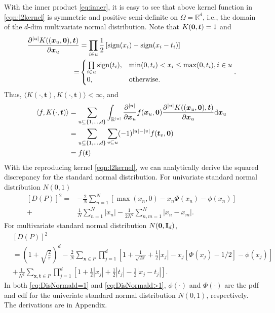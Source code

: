 \documentclass[graybox]{svmult}
\newcommand{\vx}{\boldsymbol{x}}
\newcommand{\vt}{\boldsymbol{t}}
\newcommand{\dif}{{\rm d}}
\DeclareMathOperator{\sign}{sign}
\begin{document}
With the inner product \eqref{eq:inner}, it is easy to see that above kernel function in \eqref{eqn:l2kernel} is symmetric and positive semi-definite on $\Omega = \mathbb{R}^d$, i.e., the domain of the $d$-dim multivariate normal distribution. 
Note that $K({\bf 0},\vt) = 1$ and
\begin{align*}
\frac{\partial^{|u|} K((\vx_u,{\bf 0}),\vt)}{\partial \vx_u}& =\prod_{i\in u}\frac 12 \left[\sign(x_i) - \sign(x_i - t_i) \right] \\
= &\begin{cases}
\prod\limits_{i\in u}\sign(t_i), & \min(0,t_i) < x_i \leq \max(0,t_i), i\in u\\
0, & \textrm{otherwise}.
\end{cases}.
\end{align*}
Thus, $\langle K(\cdot,\vt), K(\cdot,\vt) \rangle < \infty $, and
\begin{align*}
\langle f, K(\cdot,\vt) \rangle &= \sum_{u\subseteq \{1,...,d\}}\int_{\mathbb{R}^{|u|}}\frac{\partial^{|u|}}{\partial \vx_u}f(\vx_u,{\bf 0})\frac{\partial^{|u|} K((\vx_u,{\bf 0}),\vt)}{\partial \vx_u}\dif \vx_u \\
& =     \sum_{u\subseteq \{1,...,d\}}\sum_{v\subseteq u}(-1)^{|u|-|v|}f(\vt_v,{\bf 0})\\
& = f(\vt)
\end{align*}
With the reproducing kernel \eqref{eqn:l2kernel}, we can analytically derive the  squared discrepancy for the standard normal distribution. 
For univariate standard normal distribution $N(0,1)$ 
\begin{align}\label{eq:DisNormald=1}\nonumber
[D(P)]^2=& -\frac{2}{N}\sum_{n=1}^N \left[\max(x_n,0)-x_n\Phi(x_n)-\phi(x_n)\right]\\
+&\frac{1}{N}\sum_{n=1}^N|x_n|-\frac{1}{2N^2}\sum_{n,m=1}^N|x_n-x_m|. 
\end{align}
For multivariate standard normal distribution $N({\bf 0}, {\bf I}_d)$, 
\begin{align}\label{eq:DisNormald>1}\nonumber
&[D(P)]^2\\\nonumber
  &= \left(1+\sqrt{\frac{2}{\pi}}\right)^d - \frac{2}{N}\sum\limits_{\vx\in P} \prod\limits_{j=1}^d\left[ 1+\frac{1}{\sqrt{2\pi}}+\frac{1}{2}|x_j|-x_j[\Phi(x_j)-1/2]-\phi(x_j)\right]\\
  &+\frac{1}{N^2}\sum_{\vx,\vt\in P}\prod_{j=1}^d \left[1+\frac{1}{2}|x_j|+\frac{1}{2}|t_j|-\frac{1}{2}|x_j-t_j|\right]. 
\end{align}
In both \eqref{eq:DisNormald=1} and \eqref{eq:DisNormald>1}, $\phi(\cdot)$ and $\Phi(\cdot)$ are the pdf and cdf for the univeriate standard normal distribution $N(0,1)$, respectively. 
The derivations are in Appendix. 
\end{document}

